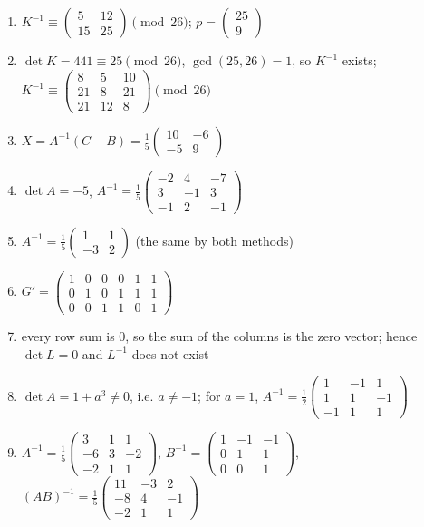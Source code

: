 \begin{enumerate}[label=\arabic*., leftmargin=*, itemsep=1pt]
\item $K^{-1}\equiv\left(\begin{smallmatrix}5&12\\15&25\end{smallmatrix}\right)\pmod{26}$; $p=\left(\begin{smallmatrix}25\\9\end{smallmatrix}\right)$
\item $\det K=441\equiv25\pmod{26}$, $\gcd(25,26)=1$, so $K^{-1}$ exists; $K^{-1}\equiv\left(\begin{smallmatrix}8&5&10\\21&8&21\\21&12&8\end{smallmatrix}\right)\pmod{26}$
\item $X=A^{-1}(C-B)=\frac15\left(\begin{smallmatrix}10&-6\\-5&9\end{smallmatrix}\right)$
\item $\det A=-5$, $A^{-1}=\frac15\left(\begin{smallmatrix}-2&4&-7\\3&-1&3\\-1&2&-1\end{smallmatrix}\right)$
\item $A^{-1}=\frac15\left(\begin{smallmatrix}1&1\\-3&2\end{smallmatrix}\right)$ (the same by both methods)
\item $G'=\left(\begin{smallmatrix}1&0&0&0&1&1\\0&1&0&1&1&1\\0&0&1&1&0&1\end{smallmatrix}\right)$
\item every row sum is $0$, so the sum of the columns is the zero vector; hence $\det L=0$ and $L^{-1}$ does not exist
\item $\det A=1+a^3\ne0$, i.e. $a\ne-1$; for $a=1$, $A^{-1}=\frac12\left(\begin{smallmatrix}1&-1&1\\1&1&-1\\-1&1&1\end{smallmatrix}\right)$
\item $A^{-1}=\frac15\left(\begin{smallmatrix}3&1&1\\-6&3&-2\\-2&1&1\end{smallmatrix}\right)$, $B^{-1}=\left(\begin{smallmatrix}1&-1&-1\\0&1&1\\0&0&1\end{smallmatrix}\right)$, $(AB)^{-1}=\frac15\left(\begin{smallmatrix}11&-3&2\\-8&4&-1\\-2&1&1\end{smallmatrix}\right)$

\end{enumerate}
